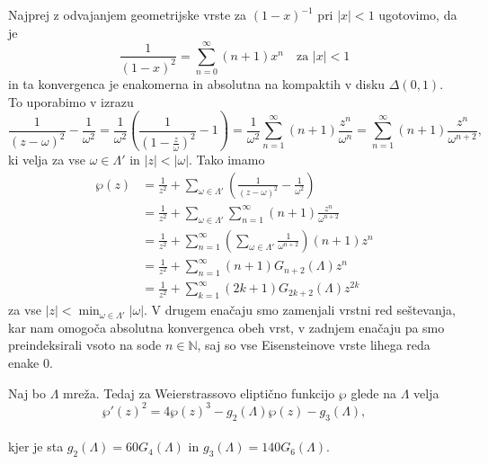 \documentclass[mat1]{fmfdelo}
\newcommand{\N}{\mathbb N}
\newcommand{\om}{\omega}
\newcommand{\abs}[1]{\left\lvert #1 \right\rvert}
\newcommand{\disk}[2]{\Delta(#1, #2)}
\theoremstyle{definition}
\begin{document}
\begin{dokaz}
    Najprej z odvajanjem geometrijske vrste za $(1 - x)^{-1}$ pri $\abs{x} < 1$ ugotovimo, da je 
    \[
        \frac{1}{(1 - x)^2} = \sum_{n = 0}^\infty (n + 1) x^n \quad \text{za $\abs{x} < 1$}  
    \]
    in ta konvergenca je enakomerna in absolutna na kompaktih v disku $\disk{0}{1}$. To uporabimo v izrazu
    \[
        \frac{1}{(z - \om)^2} - \frac{1}{\om^2} = 
        \frac{1}{\om^2}\left(\frac{1}{(1 - \frac{z}{\om})^2} - 1\right) = 
        \frac{1}{\om^2} \sum_{n = 1}^\infty (n + 1)\frac{z^n}{\om^{n}} = 
        \sum_{n = 1}^\infty (n + 1)\frac{z^n}{\om^{n + 2}}, 
    \]
    ki velja za vse $\om\in\Lambda'$ in $\abs{z} < \abs{\om}$. Tako imamo
    \begin{align*}
        \wp(z) &= 
        \frac{1}{z^2} + \sum_{\om\in\Lambda'}\left(\frac{1}{(z-\om)^2} - \frac{1}{\om^2}\right) \\
        &= \frac{1}{z^2} + \sum_{\om\in\Lambda'}\sum_{n = 1}^\infty (n + 1)\frac{z^n}{\om^{n + 2}} \\
        &= \frac{1}{z^2} + \sum_{n = 1}^\infty \left( \sum_{\om\in\Lambda'} \frac{1}{\om^{n + 2}} \right) (n + 1) z^n \\
        &= \frac{1}{z^2} + \sum_{n = 1}^\infty (n + 1) G_{n + 2}(\Lambda) z^n \\
        &= \frac{1}{z^2} + \sum_{k = 1}^\infty (2k + 1) G_{2k + 2}(\Lambda) z^{2k}
    \end{align*}
    za vse $\abs{z} < \min_{\om\in\Lambda'}\abs{\om}$. V drugem enačaju smo zamenjali vrstni red seštevanja, kar nam omogoča absolutna konvergenca obeh vrst, v zadnjem enačaju pa smo preindeksirali vsoto na sode $n\in \N$, saj so vse Eisensteinove vrste lihega reda enake $0$. 
\end{dokaz}

\begin{izrek}
    \label{ode za wp}
    Naj bo $\Lambda$ mreža. Tedaj za Weierstrassovo eliptično funkcijo $\wp$ glede na $\Lambda$ velja
    \begin{equation}
        \label{wp identiteta}
        \wp'(z)^2 = 4\wp(z)^3 - g_2(\Lambda)\wp(z) - g_3(\Lambda),
    \end{equation}
    \\
    kjer je sta $g_2(\Lambda) = 60G_4(\Lambda)$ in $g_3(\Lambda) = 140G_6(\Lambda)$.
\end{izrek}
\end{document}
